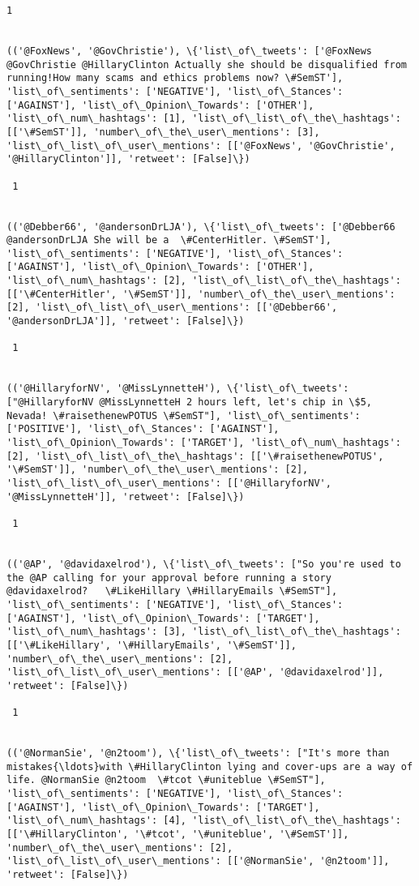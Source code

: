 \documentclass[11pt]{article}
\begin{document}
\begin{Verbatim}[commandchars=\\\{\}]
 1
 

(('@FoxNews', '@GovChristie'), \{'list\_of\_tweets': ['@FoxNews @GovChristie @HillaryClinton Actually she should be disqualified from running!How many scams and ethics problems now? \#SemST'], 'list\_of\_sentiments': ['NEGATIVE'], 'list\_of\_Stances': ['AGAINST'], 'list\_of\_Opinion\_Towards': ['OTHER'], 'list\_of\_num\_hashtags': [1], 'list\_of\_list\_of\_the\_hashtags': [['\#SemST']], 'number\_of\_the\_user\_mentions': [3], 'list\_of\_list\_of\_user\_mentions': [['@FoxNews', '@GovChristie', '@HillaryClinton']], 'retweet': [False]\})

 1
 

(('@Debber66', '@andersonDrLJA'), \{'list\_of\_tweets': ['@Debber66 @andersonDrLJA She will be a  \#CenterHitler. \#SemST'], 'list\_of\_sentiments': ['NEGATIVE'], 'list\_of\_Stances': ['AGAINST'], 'list\_of\_Opinion\_Towards': ['OTHER'], 'list\_of\_num\_hashtags': [2], 'list\_of\_list\_of\_the\_hashtags': [['\#CenterHitler', '\#SemST']], 'number\_of\_the\_user\_mentions': [2], 'list\_of\_list\_of\_user\_mentions': [['@Debber66', '@andersonDrLJA']], 'retweet': [False]\})

 1
 

(('@HillaryforNV', '@MissLynnetteH'), \{'list\_of\_tweets': ["@HillaryforNV @MissLynnetteH 2 hours left, let's chip in \$5, Nevada! \#raisethenewPOTUS \#SemST"], 'list\_of\_sentiments': ['POSITIVE'], 'list\_of\_Stances': ['AGAINST'], 'list\_of\_Opinion\_Towards': ['TARGET'], 'list\_of\_num\_hashtags': [2], 'list\_of\_list\_of\_the\_hashtags': [['\#raisethenewPOTUS', '\#SemST']], 'number\_of\_the\_user\_mentions': [2], 'list\_of\_list\_of\_user\_mentions': [['@HillaryforNV', '@MissLynnetteH']], 'retweet': [False]\})

 1
 

(('@AP', '@davidaxelrod'), \{'list\_of\_tweets': ["So you're used to the @AP calling for your approval before running a story @davidaxelrod?   \#LikeHillary \#HillaryEmails \#SemST"], 'list\_of\_sentiments': ['NEGATIVE'], 'list\_of\_Stances': ['AGAINST'], 'list\_of\_Opinion\_Towards': ['TARGET'], 'list\_of\_num\_hashtags': [3], 'list\_of\_list\_of\_the\_hashtags': [['\#LikeHillary', '\#HillaryEmails', '\#SemST']], 'number\_of\_the\_user\_mentions': [2], 'list\_of\_list\_of\_user\_mentions': [['@AP', '@davidaxelrod']], 'retweet': [False]\})

 1
 

(('@NormanSie', '@n2toom'), \{'list\_of\_tweets': ["It's more than mistakes{\ldots}with \#HillaryClinton lying and cover-ups are a way of life. @NormanSie @n2toom  \#tcot \#uniteblue \#SemST"], 'list\_of\_sentiments': ['NEGATIVE'], 'list\_of\_Stances': ['AGAINST'], 'list\_of\_Opinion\_Towards': ['TARGET'], 'list\_of\_num\_hashtags': [4], 'list\_of\_list\_of\_the\_hashtags': [['\#HillaryClinton', '\#tcot', '\#uniteblue', '\#SemST']], 'number\_of\_the\_user\_mentions': [2], 'list\_of\_list\_of\_user\_mentions': [['@NormanSie', '@n2toom']], 'retweet': [False]\})


\end{Verbatim}
\end{document}
